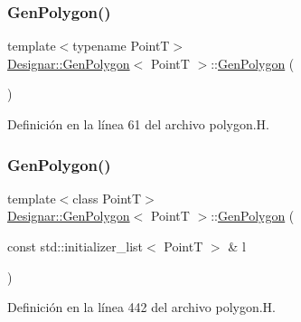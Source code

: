 \subsubsection{\texorpdfstring{Gen\+Polygon()}{GenPolygon()}\hspace{0.1cm}{\footnotesize\ttfamily [1/4]}}
{\footnotesize\ttfamily template$<$typename PointT$>$ \\
\hyperlink{class_designar_1_1_gen_polygon}{Designar\+::\+Gen\+Polygon}$<$ PointT $>$\+::\hyperlink{class_designar_1_1_gen_polygon}{Gen\+Polygon} (\begin{DoxyParamCaption}{ }\end{DoxyParamCaption})\hspace{0.3cm}{\ttfamily [inline]}}



Definición en la línea 61 del archivo polygon.\+H.

\mbox{\label{class_designar_1_1_gen_polygon_ac5ac34d76225f9c1d8895753f9e22ae8}} 
\subsubsection{\texorpdfstring{Gen\+Polygon()}{GenPolygon()}\hspace{0.1cm}{\footnotesize\ttfamily [2/4]}}
{\footnotesize\ttfamily template$<$class PointT$>$ \\
\hyperlink{class_designar_1_1_gen_polygon}{Designar\+::\+Gen\+Polygon}$<$ PointT $>$\+::\hyperlink{class_designar_1_1_gen_polygon}{Gen\+Polygon} (\begin{DoxyParamCaption}\item[{const std\+::initializer\+\_\+list$<$ PointT $>$ \&}]{l }\end{DoxyParamCaption})}



Definición en la línea 442 del archivo polygon.\+H.

\mbox{\label{class_designar_1_1_gen_polygon_a8dd52177ce8635fb198a12cc62bdb44f}} 
